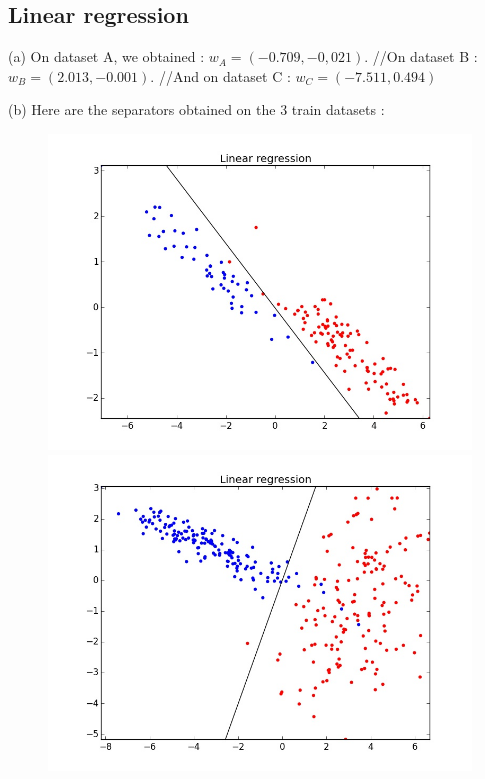 \documentclass[11pt,a4paper]{article}
\begin{document}
\subsection{Linear regression}

(a) On dataset A, we obtained : $w_A = (-0.709, -0,021)$.
//On dataset B : $w_B = (2.013, -0.001)$.
//And on dataset C : $w_C = (-7.511, 0.494)$

\medskip
(b) Here are the separators obtained on the 3 train datasets : 

\begin{figure}[H]
\centering
\noindent\includegraphics[scale=0.2]{images/linear_A.jpeg}
\noindent\includegraphics[scale=0.2]{images/linear_B.jpeg}

\end{figure}
\end{document}
